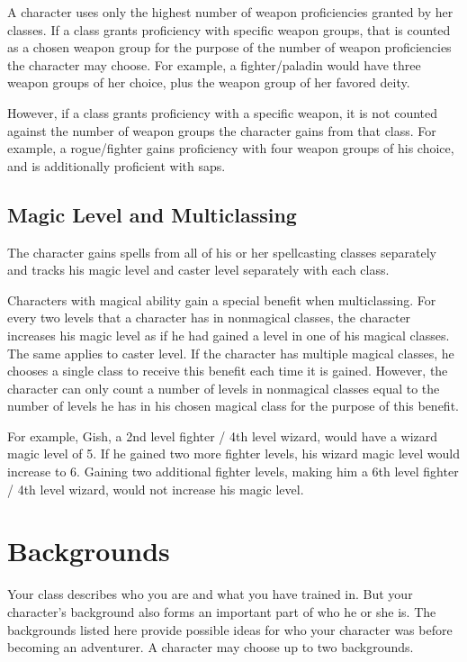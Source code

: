  A character uses only the highest number of weapon proficiencies granted by her classes. If a class grants proficiency with specific weapon groups, that is counted as a chosen weapon group for the purpose of the number of weapon proficiencies the character may choose. For example, a fighter/paladin would have three weapon groups of her choice, plus the weapon group of her favored deity.

However, if a class grants proficiency with a specific weapon, it is not counted against the number of weapon groups the character gains from that class. For example, a rogue/fighter gains proficiency with four weapon groups of his choice, and is additionally proficient with saps.

\subsection{Magic Level and Multiclassing} The character gains spells from all of his or her spellcasting classes separately and tracks his magic level and caster level separately with each class.

Characters with magical ability gain a special benefit when multiclassing. For every two levels that a character has in nonmagical classes, the character increases his magic level as if he had gained a level in one of his magical classes. The same applies to caster level. If the character has multiple magical classes, he chooses a single class to receive this benefit each time it is gained. However, the character can only count a number of levels in nonmagical classes equal to the number of levels he has in his chosen magical class for the purpose of this benefit.

For example, Gish, a 2nd level fighter / 4th level wizard, would have a wizard magic level of 5. If he gained two more fighter levels, his wizard magic level would increase to 6. Gaining two additional fighter levels, making him a 6th level fighter / 4th level wizard, would not increase his magic level.

\section{Backgrounds}
Your class describes who you are and what you have trained in. But your character's background also forms an important part of who he or she is. The backgrounds listed here provide possible ideas for who your character was before becoming an adventurer. A character may choose up to two backgrounds.

